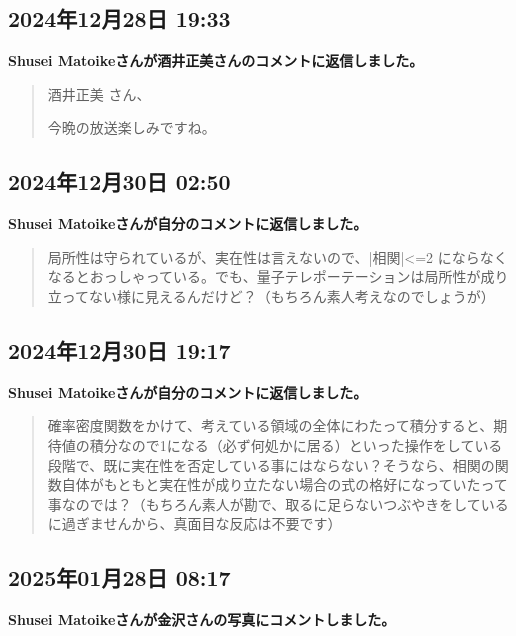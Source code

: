 \subsection*{2024年12月28日 19:33}

\textbf{Shusei Matoikeさんが酒井正美さんのコメントに返信しました。}

\begin{quote}
酒井正美 さん、

今晩の放送楽しみですね。
\end{quote}

\subsection*{2024年12月30日 02:50}

\textbf{Shusei Matoikeさんが自分のコメントに返信しました。}

\begin{quote}
局所性は守られているが、実在性は言えないので、|相関|<=2 にならなくなるとおっしゃっている。でも、量子テレポーテーションは局所性が成り立ってない様に見えるんだけど？（もちろん素人考えなのでしょうが）
\end{quote}

\subsection*{2024年12月30日 19:17}

\textbf{Shusei Matoikeさんが自分のコメントに返信しました。}

\begin{quote}
確率密度関数をかけて、考えている領域の全体にわたって積分すると、期待値の積分なので1になる（必ず何処かに居る）といった操作をしている段階で、既に実在性を否定している事にはならない？そうなら、相関の関数自体がもともと実在性が成り立たない場合の式の格好になっていたって事なのでは？（もちろん素人が勘で、取るに足らないつぶやきをしているに過ぎませんから、真面目な反応は不要です）
\end{quote}

\subsection*{2025年01月28日 08:17}

\textbf{Shusei Matoikeさんが金沢さんの写真にコメントしました。}

